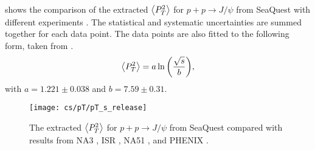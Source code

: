 \documentclass[../main.tex]{subfiles}
\begin{document}
 shows the comparison of the extracted $\expval{P_T^2}$ for $p+p\rightarrow J/\psi$ from SeaQuest 
with different experiments \cite{badier1983,clark1978,drapier1998,acharya2020}. 
The statistical and systematic uncertainties are summed together for each data point. 
The data points are also fitted to the following form, taken from \cite{acharya2020}.
\begin{equation}
	\expval{P_T^2}=a\ln{\left( \frac{\sqrt{s}}{b} \right)},
\end{equation}
with $a=1.221\pm0.038$ and $b=7.59\pm0.31$.
\begin{figure}
	\centering
	\texttt{[image: cs/pT/pT\_s\_release]}
	\caption{The extracted $\expval{P_T^2}$ for $p+p\rightarrow J/\psi$ from SeaQuest compared
	with results from NA3 \cite{badier1983}, ISR \cite{clark1978}, NA51 \cite{drapier1998},
	and PHENIX \cite{acharya2020}. }
	\label{fig:pT_s}
\end{figure}



\ifSubfilesClassLoaded{ \printbibliography[heading=bibintoc,title={References}]}{}
\end{document}

